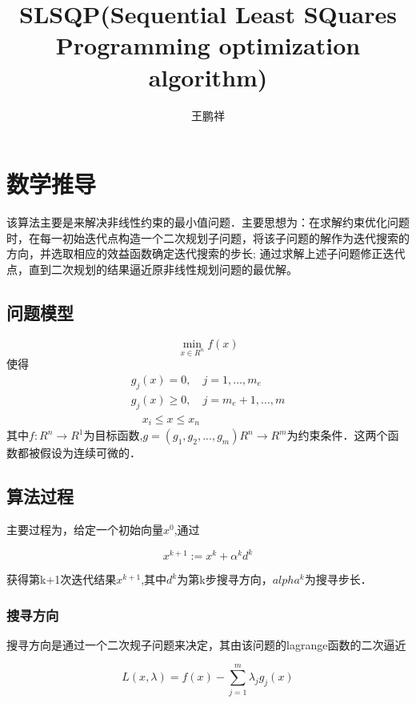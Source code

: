 \documentclass{article}
\begin{document}
\title{SLSQP(Sequential Least SQuares Programming optimization algorithm)}
\author{王鹏祥}
\date{\chntoday}
\maketitle
\tableofcontents
\newpage

\section{数学推导}
该算法主要是来解决非线性约束的最小值问题．主要思想为：在求解约束优化问题时，在每一初始迭代点构造一个二次规划子问题，将该子问题的解作为迭代搜索的方向，并选取相应的效益函数确定迭代搜索的步长; 通过求解上述子问题修正迭代点，直到二次规划的结果逼近原非线性规划问题的最优解。

\subsection{问题模型}
\begin{equation}
\min _{x \in R^{n}} f(x)
\end{equation}
使得
\begin{equation}\begin{array}{c}
g_{j}(x)=0, \quad j=1, \ldots, m_{e} \\
g_{j}(x) \geq 0, \quad j=m_{e}+1, \ldots, m \\
\quad x_{i} \leq x \leq x_{n}
\end{array}\end{equation}
其中$f: R^{n} \rightarrow R^{1}$为目标函数,$g=(g_1,g_2,...,g_m) R^{n} \rightarrow R^{m}$为约束条件．这两个函数都被假设为连续可微的．
\subsection{算法过程}
主要过程为，给定一个初始向量$x^0$,通过

\begin{equation}
x^{k+1}:=x^k+\alpha^k d^k
\end{equation}

获得第k+1次迭代结果$x^{k+1}$,其中$d^k$为第k步搜寻方向，$alpha^k$为搜寻步长．

\subsubsection{搜寻方向}
搜寻方向是通过一个二次规子问题来决定，其由该问题的lagrange函数的二次逼近

\begin{equation}
L(x, \lambda)=f(x)-\sum_{j=1}^{m} \lambda_{j} g_{j}(x)
\end{equation}
\end{document}
